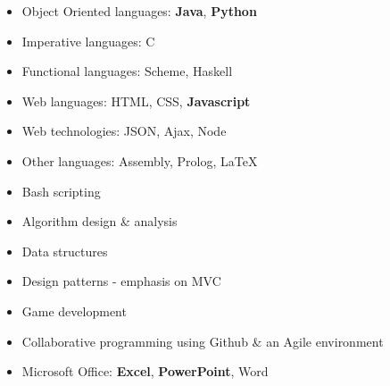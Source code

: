 \documentclass[]{friggeri-cv} %
\begin{document}
\begin{minipage}[t]{0.5\textwidth}
\begin{itemize}
\item{Object Oriented languages: \textbf{Java}, \textbf{Python}}
\item{Imperative languages: C}
\item{Functional languages: Scheme, Haskell}
\item{Web languages: HTML, CSS, \textbf{Javascript}}
\item{Web technologies: JSON, Ajax, Node}
\item{Other languages: Assembly, Prolog, \LaTeX}
\item{Bash scripting}
\end{itemize}
\end{minipage}
\begin{minipage}[t]{0.5\textwidth}
\begin{itemize}
\item{Algorithm design \& analysis}
\item{Data structures}
\item{Design patterns - emphasis on MVC}
\item{Game development}
\item{Collaborative programming using Github \& an Agile environment}
\item{Microsoft Office: \textbf{Excel}, \textbf{PowerPoint}, Word}
\end{itemize}
\end{minipage}
\vspace{0.4em}

\end{document}
